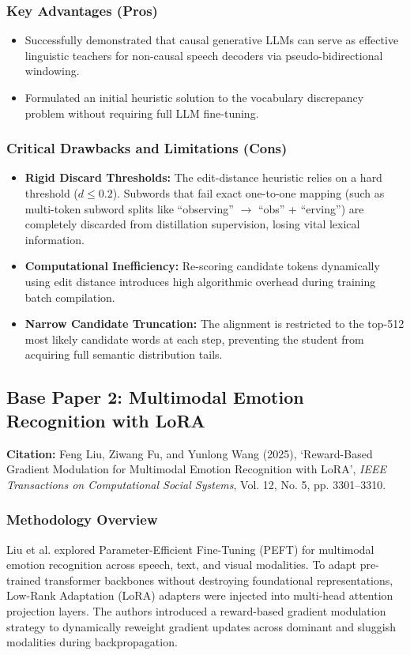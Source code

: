 \subsubsection{Key Advantages (Pros)}
\begin{itemize}
    \item Successfully demonstrated that causal generative LLMs can serve as effective linguistic teachers for non-causal speech decoders via pseudo-bidirectional windowing.
    \item Formulated an initial heuristic solution to the vocabulary discrepancy problem without requiring full LLM fine-tuning.
\end{itemize}

\subsubsection{Critical Drawbacks and Limitations (Cons)}
\begin{itemize}
    \item \textbf{Rigid Discard Thresholds:} The edit-distance heuristic relies on a hard threshold ($d \le 0.2$). Subwords that fail exact one-to-one mapping (such as multi-token subword splits like ``observing'' $\to$ ``obs'' + ``erving'') are completely discarded from distillation supervision, losing vital lexical information.
    \item \textbf{Computational Inefficiency:} Re-scoring candidate tokens dynamically using edit distance introduces high algorithmic overhead during training batch compilation.
    \item \textbf{Narrow Candidate Truncation:} The alignment is restricted to the top-512 most likely candidate words at each step, preventing the student from acquiring full semantic distribution tails.
\end{itemize}

\subsection{Base Paper 2: Multimodal Emotion Recognition with LoRA}
\textbf{Citation:} Feng Liu, Ziwang Fu, and Yunlong Wang (2025), `Reward-Based Gradient Modulation for Multimodal Emotion Recognition with LoRA', \textit{IEEE Transactions on Computational Social Systems}, Vol. 12, No. 5, pp. 3301--3310.

\subsubsection{Methodology Overview}
Liu et al. explored Parameter-Efficient Fine-Tuning (PEFT) for multimodal emotion recognition across speech, text, and visual modalities. To adapt pre-trained transformer backbones without destroying foundational representations, Low-Rank Adaptation (LoRA) adapters were injected into multi-head attention projection layers. The authors introduced a reward-based gradient modulation strategy to dynamically reweight gradient updates across dominant and sluggish modalities during backpropagation.

